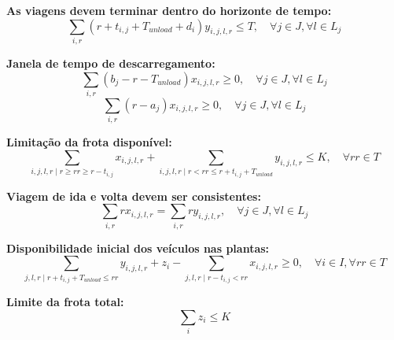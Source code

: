 \textbf{As viagens devem terminar dentro do horizonte de tempo:}
\begin{equation}
    \sum_{i,r} (r + t_{i,j} + T_{unload} + d_{i}) y_{i,j,l,r} \leq T, \quad \forall j \in J, \forall l \in L_j
\end{equation}

\textbf{Janela de tempo de descarregamento:}
\begin{equation}
    \sum_{i,r} (b_j - r - T_{unload}) x_{i,j,l,r} \geq 0, \quad \forall j \in J, \forall l \in L_j
\end{equation}
\begin{equation}
    \sum_{i,r} (r - a_j) x_{i,j,l,r} \geq 0, \quad \forall j \in J, \forall l \in L_j
\end{equation}

\textbf{Limitação da frota disponível:}
\begin{equation}
  \sum_{i,j,l,r \mid r \geq rr \geq r - t_{i,j}} x_{i,j,l,r} +
  \sum_{i,j,l,r \mid r < rr \leq r + t_{i,j} + T_{unload}} y_{i,j,l,r} 
  \leq K, \quad \forall rr \in T
\end{equation}

\textbf{Viagem de ida e volta devem ser consistentes:}
\begin{equation}
    \sum_{i,r} r x_{i,j,l,r} = \sum_{i,r} r y_{i,j,l,r}, \quad \forall j \in J, \forall l \in L_j
\end{equation}

\textbf{Disponibilidade inicial dos veículos nas plantas:}
\begin{equation}
  \sum_{j,l,r \mid r + t_{i,j} + T_{unload} \leq rr} y_{i,j,l,r} + z_i -
  \sum_{j,l,r \mid r - t_{i,j} < rr} x_{i,j,l,r} \geq 0, \quad \forall i \in I, \forall rr \in T
\end{equation}

\textbf{Limite da frota total:}
\begin{equation}
    \sum_{i} z_i \leq K
\end{equation}
